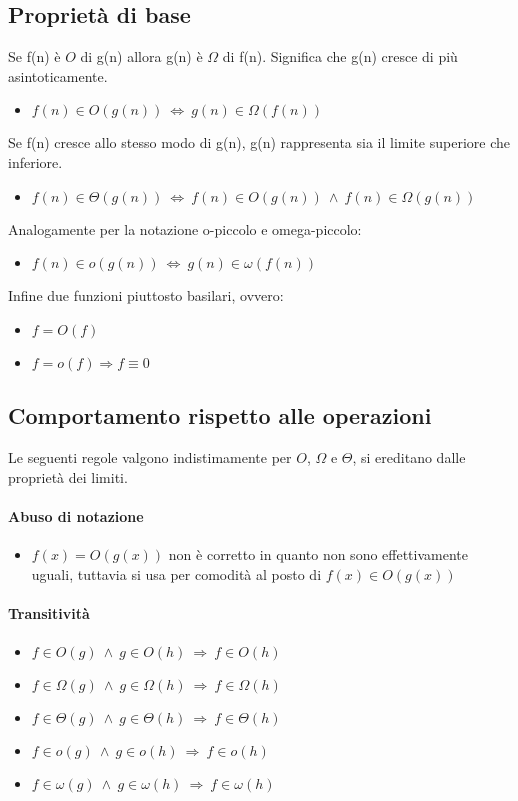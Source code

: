 \documentclass{article}
\begin{document}
\subsection{Proprietà di base} %
Se f(n) è $O$ di g(n) allora g(n) è $\Omega$ di f(n). Significa che g(n) cresce di più asintoticamente.
\begin{itemize}
\item $f(n) \in O(g(n)) \ \Leftrightarrow \ g(n) \in \Omega(f(n))$
\end{itemize}
Se f(n) cresce allo stesso modo di g(n), g(n) rappresenta sia il limite superiore che inferiore.
\begin{itemize}
\item $f(n) \in \Theta(g(n)) \ \Leftrightarrow \ f(n) \in O(g(n)) \ \wedge \ f(n) \in \Omega(g(n))$
\end{itemize}
Analogamente per la notazione o-piccolo e omega-piccolo:
\begin{itemize}
\item $f(n) \in o(g(n)) \ \Leftrightarrow \ g(n) \in \omega(f(n))$
\end{itemize}
Infine due funzioni piuttosto basilari, ovvero:
\begin{itemize}
    \item $f=O(f)$ 
    \item $f = o(f) \Rightarrow f \equiv 0 $
\end{itemize}

\subsection{Comportamento rispetto alle operazioni} %
Le seguenti regole valgono indistimamente per $O$, $\Omega$ e $\Theta$, si ereditano dalle proprietà dei limiti.
\paragraph{Abuso di notazione}
\begin{itemize}
    \item $f(x) = O(g(x))$ non è corretto in quanto non sono effettivamente uguali, tuttavia si usa per comodità al posto di $f(x) \in O(g(x))$
\end{itemize}
\paragraph{Transitività}
\begin{itemize}
    \item $f \in O(g) \ \wedge \ g \in O(h) \ \Rightarrow \ f \in O(h)$
    \item $f \in \Omega(g) \ \wedge \ g \in \Omega(h) \ \Rightarrow \ f \in \Omega(h)$
    \item $f \in \Theta(g) \ \wedge \ g \in \Theta(h) \ \Rightarrow \ f \in \Theta(h)$
    \item $f \in o(g) \ \wedge \ g \in o(h) \ \Rightarrow \ f \in o(h)$
    \item $f \in \omega(g) \ \wedge \ g \in \omega(h) \ \Rightarrow \ f \in \omega(h)$
\end{itemize}
\end{document}
